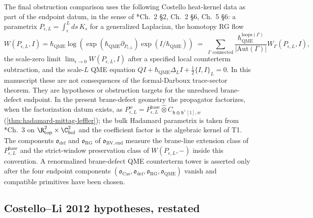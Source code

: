 \begin{rmk}
\label{rmk:t4-costello-renorm-datum}
  The final obstruction comparison uses the following Costello
  heat-kernel data as part of the endpoint datum, in the sense of
  \cite{costello-renormalization}*{Ch.~2 \S2, Ch.~2 \S6, Ch.~5
  \S6}: a parametrix
  \(P_{\epsilon,L}=\int_\epsilon^Lds\,K_s\) for a generalized
  Laplacian, the homotopy RG flow
  \[
    W(P_{\epsilon,L},I)
      =\hbar_{\mathrm{QME}}\log\!\left(
        \exp(\hbar_{\mathrm{QME}}\partial_{P_{\epsilon,L}})\exp(I/\hbar_{\mathrm{QME}})
      \right)
      \;=\;
      \sum_{\Gamma\text{ connected}}
        \frac{\hbar_{\mathrm{QME}}^{\mathrm{loops}(\Gamma)}}
             {\lvert\mathrm{Aut}(\Gamma)\rvert}
        W_\Gamma(P_{\epsilon,L},I),
  \]
  the scale-zero limit
  \(\lim_{\epsilon\to0}W(P_{\epsilon,L},I)\) after a specified local
  counterterm subtraction, and the scale-\(L\) QME equation
  \(QI+\hbar_{\mathrm{QME}}\Delta_LI+\tfrac12\{I,I\}_L=0\).  In this manuscript these
  are not consequences of the formal-Darboux trace-sector theorem.
  They are hypotheses or obstruction targets for the unreduced
  brane-defect endpoint.  In the present brane-defect geometry the
  propagator factorizes, when the factorization datum exists, as
  \(P^w_{\epsilon,L}=P^{\mathrm{base}}_{\epsilon,L}
  \widehat\otimes C_{\mathfrak h\oplus\mathfrak h^\vee[1],w}\)
  (\ref{thm:hadamard-mittag-leffler}); the bulk Hadamard parametrix is
  taken from \cite{costello-renormalization}*{Ch.~3} on
  \(\R^2_{\mathrm{top}}\times\C^2_{\mathrm{hol}}\) and the coefficient
  factor is the algebraic kernel of T1.  The components
  \(\mathfrak o_{\mathrm{def}}\) and \(\mathfrak o_{\mathrm{RG}}\) of
  \(\mathfrak o_{\mathrm{BV,end}}\) measure the brane-line extension class
  of \(P^{\mathrm{base}}_{\epsilon,L}\) and the strict-window preservation
  class of \(W(P_{\epsilon,L},-)\) inside this convention.  A
  renormalized brane-defect QME counterterm tower is asserted only after the
  four endpoint components
  \((\mathfrak o_{\mathrm{Cas}},\mathfrak o_{\mathrm{def}},
  \mathfrak o_{\mathrm{RG}},\mathfrak o_{\mathrm{QME}})\) vanish and
  compatible primitives have been chosen.
\end{rmk}

\subsection*{Costello--Li 2012 hypotheses, restated}

